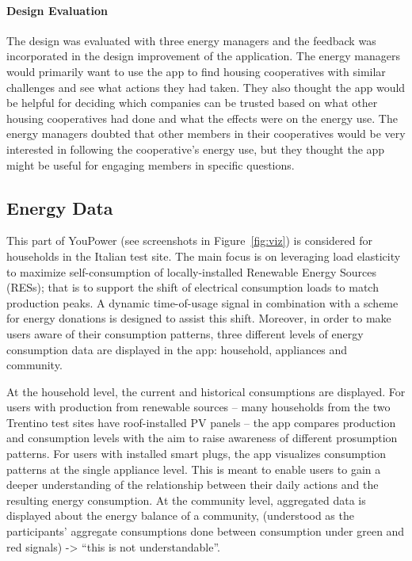 \paragraph{Design Evaluation}

The design was evaluated with three energy managers and the feedback was incorporated in the design improvement of the application. The energy managers would primarily want to use the app to find housing cooperatives with similar challenges and see what actions they had taken. They also thought the app would be helpful for deciding which companies can be trusted based on what other housing cooperatives had done and what the effects were on the energy use. The energy managers doubted that other members in their cooperatives would be very interested in following the cooperative's energy use, but they thought the app might be useful for engaging members in specific questions. 

\subsection{Energy Data} 
\label{sect:load_shifting}

This part of YouPower (see screenshots in Figure~\ref{fig:viz}) is considered for households in the Italian test site.
The main focus is on leveraging load elasticity to maximize self-consumption of locally-installed Renewable Energy Sources (RESs); that is to support the shift of electrical consumption loads to match production peaks. A dynamic time-of-usage signal in combination with a scheme for energy donations is designed to assist this shift. Moreover, in order to make users aware of their consumption patterns, three different levels of energy consumption data are displayed in the app: household, appliances and community. 

At the household level, the current and historical consumptions are displayed. For users with production from renewable sources -- many households from the two Trentino test sites have roof-installed PV panels -- the app compares production and consumption levels with the aim to raise awareness of different prosumption patterns. %
% 
For users with installed smart plugs, the app visualizes consumption patterns at the single appliance level. This is meant to enable users to gain a deeper understanding of the relationship between their daily actions and the resulting energy consumption. 
%
At the community level, aggregated data is displayed about the energy balance of a community, (understood as the participants' aggregate consumptions done between consumption under green and red signals) -> ``this is not understandable''.

